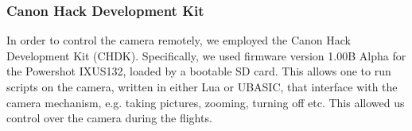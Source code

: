 \subsubsection{Canon Hack Development Kit}

In order to control the camera remotely, we employed the Canon Hack Development
Kit (CHDK). Specifically, we used firmware
version 1.00B Alpha for the Powershot
IXUS132, loaded by a bootable SD
card. This allows one to run scripts on the camera, written in either Lua or
UBASIC, that interface with the camera mechanism, e.g. taking pictures, zooming,
turning off etc. This allowed us control over the camera during the flights.
